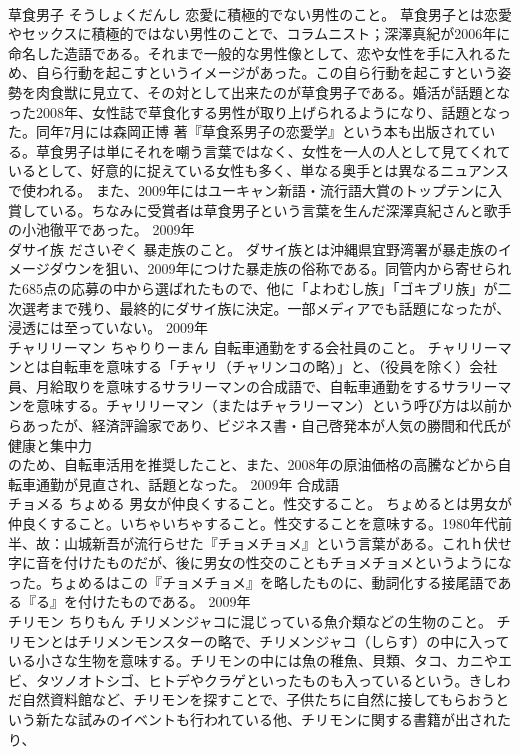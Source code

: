 \documentclass[8pt]{extreport}
\begin{document}
\begin{CJK}{UTF8}{min}
\\	草食男子	そうしょくだんし	恋愛に積極的でない男性のこと。	草食男子とは恋愛やセックスに積極的ではない男性のことで、コラムニスト；深澤真紀が2006年に命名した造語である。それまで一般的な男性像として、恋や女性を手に入れるため、自ら行動を起こすというイメージがあった。この自ら行動を起こすという姿勢を肉食獣に見立て、その対として出来たのが草食男子である。婚活が話題となった2008年、女性誌で草食化する男性が取り上げられるようになり、話題となった。同年7月には森岡正博 著『草食系男子の恋愛学』という本も出版されている。草食男子は単にそれを嘲う言葉ではなく、女性を一人の人として見てくれているとして、好意的に捉えている女性も多く、単なる奥手とは異なるニュアンスで使われる。 また、2009年にはユーキャン新語・流行語大賞のトップテンに入賞している。ちなみに受賞者は草食男子という言葉を生んだ深澤真紀さんと歌手の小池徹平であった。	2009年	
\\	ダサイ族	ださいぞく	暴走族のこと。	ダサイ族とは沖縄県宜野湾署が暴走族のイメージダウンを狙い、2009年につけた暴走族の俗称である。同管内から寄せられた685点の応募の中から選ばれたもので、他に「よわむし族」「ゴキブリ族」が二次選考まで残り、最終的にダサイ族に決定。一部メディアでも話題になったが、浸透には至っていない。	2009年	
\\	チャリリーマン	ちゃりりーまん	自転車通勤をする会社員のこと。	チャリリーマンとは自転車を意味する「チャリ（チャリンコの略）」と、（役員を除く）会社員、月給取りを意味するサラリーマンの合成語で、自転車通勤をするサラリーマンを意味する。チャリリーマン（またはチャラリーマン）という呼び方は以前からあったが、経済評論家であり、ビジネス書・自己啓発本が人気の勝間和代氏が健康と集中力
\\	のため、自転車活用を推奨したこと、また、2008年の原油価格の高騰などから自転車通勤が見直され、話題となった。	2009年	合成語	
\\	チョメる	ちょめる	男女が仲良くすること。性交すること。	ちょめるとは男女が仲良くすること。いちゃいちゃすること。性交することを意味する。1980年代前半、故：山城新吾が流行らせた『チョメチョメ』という言葉がある。これｈ伏せ字に音を付けたものだが、後に男女の性交のこともチョメチョメというようになった。ちょめるはこの『チョメチョメ』を略したものに、動詞化する接尾語である『る』を付けたものである。	2009年	
\\	チリモン	ちりもん	チリメンジャコに混じっている魚介類などの生物のこと。	チリモンとはチリメンモンスターの略で、チリメンジャコ（しらす）の中に入っている小さな生物を意味する。チリモンの中には魚の稚魚、貝類、タコ、カニやエビ、タツノオトシゴ、ヒトデやクラゲといったものも入っているという。きしわだ自然資料館など、チリモンを探すことで、子供たちに自然に接してもらおうという新たな試みのイベントも行われている他、チリモンに関する書籍が出されたり、

\end{CJK}
\end{document}
